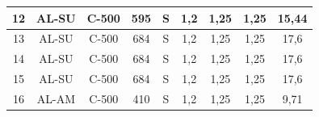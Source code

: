 \begin{table}[htbp]
\begin{tabular}{|c|c|c|c|c|cccc|}
12                                                    & AL-SU                                                      & C-500                                                           & 595                                                                                                              & S                                                         & \multicolumn{1}{c|}{1,2}                                & \multicolumn{1}{c|}{1,25}                               & \multicolumn{1}{c|}{1,25}                               & 15,44                                                           \\ \hline
13                                                    & AL-SU                                                      & C-500                                                           & 684                                                                                                              & S                                                         & \multicolumn{1}{c|}{1,2}                                & \multicolumn{1}{c|}{1,25}                               & \multicolumn{1}{c|}{1,25}                               & 17,6                                                            \\ \hline
14                                                    & AL-SU                                                      & C-500                                                           & 684                                                                                                              & S                                                         & \multicolumn{1}{c|}{1,2}                                & \multicolumn{1}{c|}{1,25}                               & \multicolumn{1}{c|}{1,25}                               & 17,6                                                            \\ \hline
15                                                    & AL-SU                                                      & C-500                                                           & 684                                                                                                              & S                                                         & \multicolumn{1}{c|}{1,2}                                & \multicolumn{1}{c|}{1,25}                               & \multicolumn{1}{c|}{1,25}                               & 17,6                                                            \\ \hline
16                                                    & AL-AM                                                      & C-500                                                           & 410                                                                                                              & S                                                         & \multicolumn{1}{c|}{1,2}                                & \multicolumn{1}{c|}{1,25}                               & \multicolumn{1}{c|}{1,25}                               & 9,71                                                            \\ \hline

\end{tabular}
\end{table}
